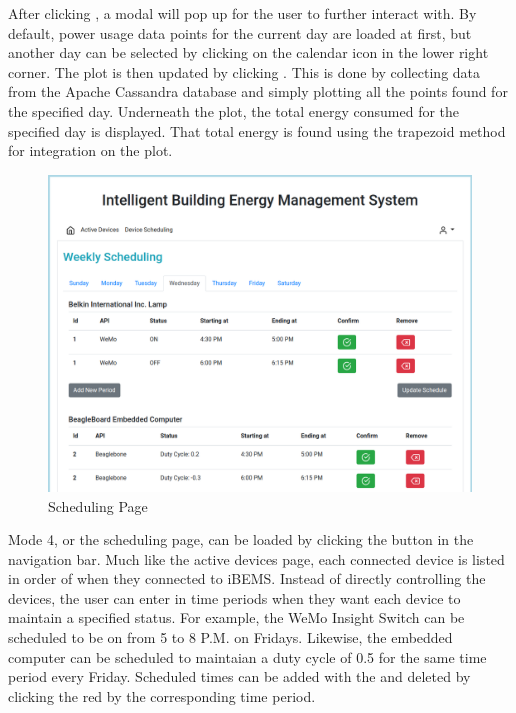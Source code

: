 After clicking , a modal will pop up for the user to further
interact with. By default, power usage data points for the current day are
loaded at first, but another day can be selected by clicking on the calendar
icon in the lower right corner. The plot is then updated by clicking . This is done by collecting data from the Apache Cassandra database and
simply plotting all the points found for the specified day. Underneath the plot,
the total energy consumed for the specified day is displayed. That total energy
is found using the trapezoid method for integration on the plot. %
%
\begin{figure}
    \centering
    \includegraphics[scale=0.35]{figs/webServer/Applications_screen.png}
    \caption{Scheduling Page}
    \label{fig:schedulingl}
\end{figure}
%

Mode 4, or the scheduling page, can be loaded by clicking the  button in the navigation bar. Much like the active devices page,
each connected device is listed in order of when they connected to iBEMS.
Instead of directly controlling the devices, the user can enter in time periods
when they want each device to maintain a specified status. For example, the WeMo
Insight Switch can be scheduled to be on from 5 to 8 P.M. on Fridays. Likewise,
the embedded computer can be scheduled to maintaian a duty cycle of 0.5 for the
same time period every Friday. Scheduled times can be added with the  and deleted by clicking the red  by the corresponding time period.

